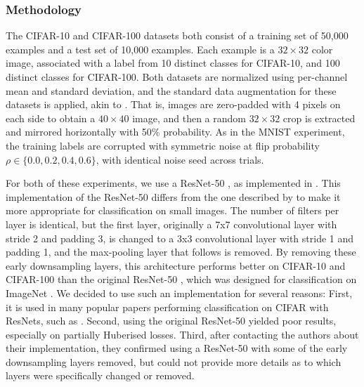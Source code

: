 \subsubsection{Methodology}

The CIFAR-10 and CIFAR-100 datasets \citep{krizhevsky_learning_2009} both consist of a training set of 50,000 examples and a test set of 10,000 examples. Each example is a $32 \times 32$ color image, associated with a label from 10 distinct classes for CIFAR-10, and 100 distinct classes for CIFAR-100. Both datasets are normalized using per-channel mean and standard deviation, and the standard data augmentation for these datasets is applied, akin to  \citet{zagoruyko_wide_2016}. That is, images are zero-padded with 4 pixels on each side to obtain a $40 \times 40$ image, and then a random $32 \times 32$ crop is extracted and mirrored horizontally with 50\% probability. As in the MNIST experiment, the training labels are corrupted with symmetric noise at flip probability $\rho \in \{0.0,0.2,0.4,0.6\}$, with identical noise seed across trials.

For both of these experiments, we use a ResNet-50 \citep{he_deep_2015}, as implemented in \citet{liu_kuangliupytorch-cifar_2017}. This implementation of the ResNet-50 differs from the one described by \citet{he_deep_2015} to make it more appropriate for classification on small images. The number of filters per layer is identical, but the first layer, originally a 7x7 convolutional layer with stride 2 and padding 3, is changed to a 3x3 convolutional layer with stride 1 and padding 1, and the max-pooling layer that follows is removed. By removing these early downsampling layers, this architecture performs better on CIFAR-10 and CIFAR-100 than the original ResNet-50 \footnotemark, which was designed for classification on ImageNet  \citep{imagenet_cvpr09}. We decided to use such an implementation for several reasons: First, it is used in many popular papers performing classification on CIFAR with ResNets, such as \citet{devries_improved_2017, zhang_mixup_2018, li_dividemix_2020, zhang_lookahead_2019}. Second, using the original ResNet-50 yielded poor results, especially on partially Huberised losses. Third, after contacting the authors about their implementation, they confirmed using a ResNet-50 with some of the early downsampling layers removed, but could not provide more details as to which layers were specifically changed or removed. 


